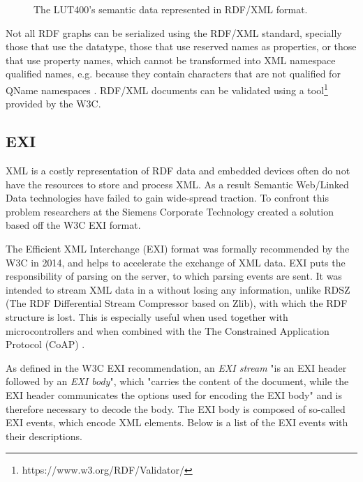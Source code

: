 \begin{figure}[th]
	\centering
	\resizebox{\textwidth}{!}{}
    \caption{The LUT400's semantic data represented in RDF/XML format.}
    \label{fig:rdfxml}
\end{figure}



Not all RDF graphs can be serialized using the RDF/XML standard, specially those that use the  datatype, those that use reserved names as properties, or those that use property names, which cannot be transformed into XML namespace qualified names, e.g. because they contain characters that are not qualified for QName namespaces \cite{RDFXML.02.10.2017}. RDF/XML documents can be validated using a tool\footnote{https://www.w3.org/RDF/Validator/} provided by the W3C.


\subsection{EXI}
XML is a costly representation of RDF data and embedded devices often do not have the resources to store and process XML. As a result Semantic Web/Linked Data technologies have failed to gain wide-spread traction. To confront this problem researchers at the Siemens Corporate Technology created a solution based off the W3C EXI format. \cite{Kabisch.2015}

The Efficient XML Interchange (EXI) format was formally recommended by the W3C in 2014, and helps to accelerate the exchange of XML data. EXI puts the responsibility of parsing on the server, to which parsing events are sent. It was intended to stream XML data in a without losing any information, unlike RDSZ (The RDF Differential Stream Compressor based on Zlib), with which the RDF structure is lost. This is especially useful when used together with microcontrollers \cite{Kabisch.2015} and when combined with the The Constrained Application Protocol (CoAP) \cite{castellani2011web}.

As defined in the W3C EXI recommendation, an \textit{EXI stream} "is an EXI header followed by an \textit{EXI body}", which "carries the content of the document, while the EXI header communicates the options used for encoding the EXI body" and is therefore necessary to decode the body. The EXI body is composed of so-called EXI events, which encode XML elements. Below is a list of the EXI events with their descriptions. \cite{.02.10.2017b}


